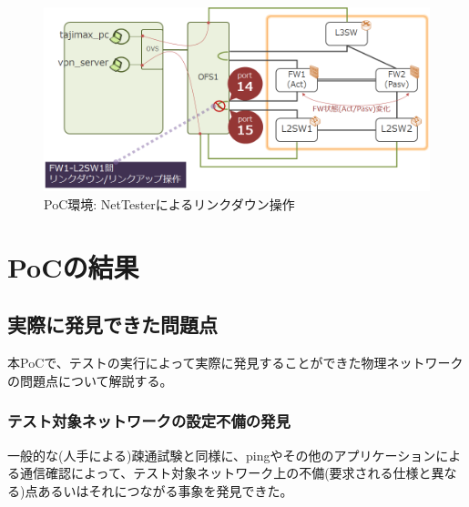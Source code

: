 \begin{figure}[h]
 \centering
 \includegraphics[scale=0.6]{img/poc-env-linkdown.png}
 \caption{PoC環境: NetTesterによるリンクダウン操作}
 \label{fig:poc-env-linkdown}
\end{figure}

 \section{PoCの結果}

  \subsection{実際に発見できた問題点}
本PoCで、テストの実行によって実際に発見することができた物理ネットワーク
の問題点について解説する。

   \subsubsection{テスト対象ネットワークの設定不備の発見}


一般的な(人手による)疎通試験と同様に、pingやその他のアプリケーションによ
る通信確認によって、テスト対象ネットワーク上の不備(要求される仕様と異な
る)点あるいはそれにつながる事象を発見できた。

